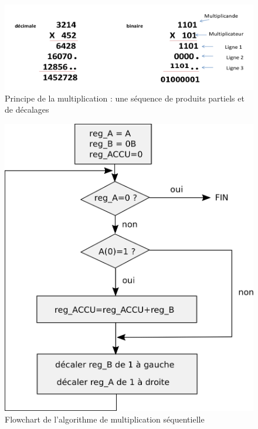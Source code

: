 \documentclass[a4paper,11pt]{article}
\begin{document}
\begin{figure}[!h]
\begin{center}
\includegraphics[scale=0.4]{./figures/algo_mult2.png}
\end{center}
\caption{Principe de la multiplication : une séquence de produits partiels et de décalages}
\end{figure}

\begin{figure}[!h]
\begin{center}
\includegraphics[scale=0.15]{./figures/flowchart.png}
\end{center}
\caption{Flowchart de l'algorithme de multiplication séquentielle}
\end{figure}
\FloatBarrier
\end{document}
